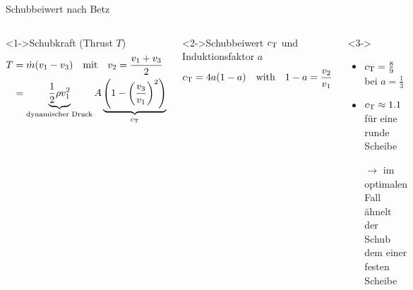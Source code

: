 \begin{frame}{Schubbeiwert nach Betz}
\setlength{\abovedisplayskip}{0pt}
\setlength{\belowdisplayskip}{1pt} 	
\begin{columns}
\column{8cm}
	\begin{block}<1->{Schubkraft (Thrust $T$)}
		\begin{align*}
		T   &= \dot m  (v_1 - v_3)  \quad\textnormal{mit}\quad v_2=\frac{v_1+v_3}{2}\\
		&= \underbrace{\frac{1}{2}\rho v_1^2}_{\textnormal{dynamischer Druck}} A 
		\underbrace{\left(1-\left(\frac{v_3}{v_1}\right)^2\right)}_{c_{\textnormal{T} } }
		\end{align*}
	\end{block}	
	\begin{block}<2->{Schubbeiwert $c_{\textnormal{T}}$ und Induktionsfaktor $a$}
		\begin{align*}
		c_{\textnormal{T}} = 4a(1-a) \quad\textnormal{with}\quad 1-a=\frac{v_2}{v_1}
		\end{align*}
	\end{block}	
\column{6cm} 
	\centering
	\begin{block}<3->{}
		\begin{itemize}
			\item $c_{\textnormal{T}}=\frac{8}{9}$ bei $a=\frac{1}{3}$
			\item 	$c_{\textnormal{T}}\approx1.1$ für eine runde Scheibe\\
			\item[$\rightarrow$] im optimalen Fall ähnelt der Schub dem einer festen Scheibe
		\end{itemize}	
	\end{block}			
\end{columns} 
\end{frame}
